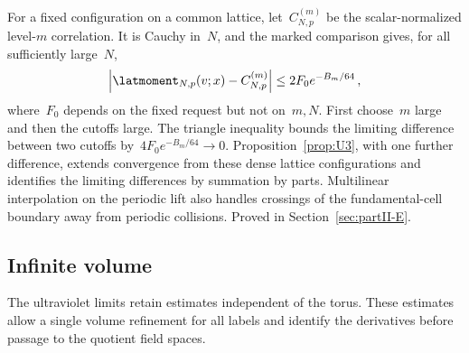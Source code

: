 For a fixed configuration on a common lattice, let~$C_{N,p}^{(m)}$ be the scalar-normalized level-$m$ correlation. It is Cauchy in~$N$, and the marked comparison gives, for all sufficiently large~$N$,
\begin{equation}\label{eq:U4-comparison}
\left|\latmoment_{N,p}(v;x)-C_{N,p}^{(m)}\right|\le2F_0e^{-B_m/64}\,,
\end{equation}
where~$F_0$ depends on the fixed request but not on~$m,N$. First choose~$m$ large and then the cutoffs large. The triangle inequality bounds the limiting difference between two cutoffs by~$4F_0e^{-B_m/64}\to0$. Proposition~\ref{prop:U3}, with one further difference, extends convergence from these dense lattice configurations and identifies the limiting differences by summation by parts. Multilinear interpolation on the periodic lift also handles crossings of the fundamental-cell boundary away from periodic collisions. Proved in Section~\ref{sec:partII-E}.

\subsection{Infinite volume}

The ultraviolet limits retain estimates independent of the torus. These estimates
allow a single volume refinement for all labels and identify the derivatives
before passage to the quotient field spaces.

